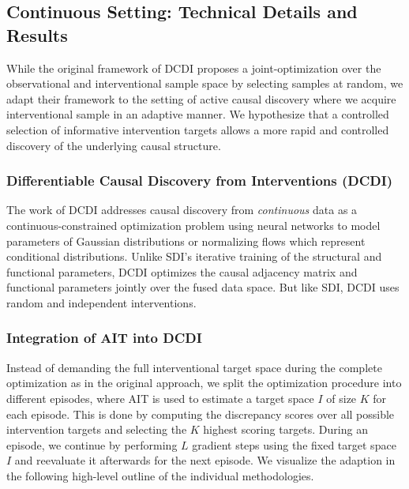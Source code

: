 \documentclass[nohyperref]{article}
\theoremstyle{plain}
\theoremstyle{definition}
\theoremstyle{remark}
\begin{document}

\clearpage
\subsection{Continuous Setting: Technical Details and Results}
\label{sec:appendix_dcdi}

While the original framework of DCDI \citep{brouillard2020differentiable} proposes a joint-optimization over the observational and interventional sample space by selecting samples at random, we adapt their framework to the setting of active causal discovery where we acquire interventional sample in an adaptive manner. We hypothesize that a controlled selection of informative intervention targets allows a more rapid and controlled discovery of the underlying causal structure.

\subsubsection{Differentiable Causal Discovery from Interventions (DCDI)}
The work of DCDI \citep{brouillard2020differentiable} addresses causal discovery from \emph{continuous} data as a continuous-constrained optimization problem using neural networks to model parameters of Gaussian distributions or normalizing flows \citep{rezende2015variational} which represent conditional distributions. Unlike SDI's iterative training of the structural and functional parameters, DCDI optimizes the causal adjacency matrix and functional parameters jointly over the fused data space. But like SDI, DCDI  uses random and independent interventions. 

\subsubsection{Integration of AIT into DCDI}
\label{sec:dcdi_ait_integration}
Instead of demanding the full interventional target space during the complete optimization as in the original approach, we split the optimization procedure into different episodes, where AIT is used to estimate a target space $I$ of size $K$ for each episode. This is done by computing the discrepancy scores over all possible intervention targets and selecting the $K$ highest scoring targets. During an episode, we continue by performing $L$ gradient steps using the fixed target space $I$ and reevaluate it afterwards for the next episode. We visualize the adaption in the following high-level outline of the individual methodologies. 
\end{document}
